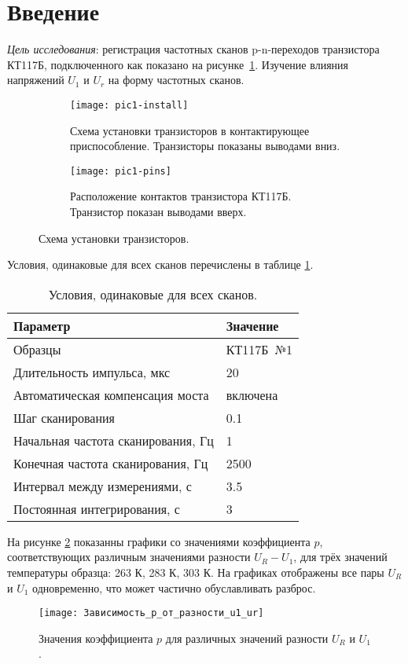 \section{Введение}

\emph{Цель исследования}: регистрация частотных сканов p-n-переходов 
транзистора КТ117Б, подключенного как показано на рисунке~\ref{pic:installation}. 
Изучение влияния напряжений $U_1$ и $U_r$ на форму частотных сканов.
\begin{figure}[!ht]
	\centering
	\begin{subfigure}[t]{0.45\textwidth}
		\centering
		\texttt{[image: pic1-install]}
		\caption{Схема установки транзисторов в контактирующее
		приспособление. Транзисторы показаны выводами вниз.}
	\end{subfigure}
	\begin{subfigure}[t]{0.45\textwidth}
		\centering
		\texttt{[image: pic1-pins]}
		\caption{Расположение контактов транзистора КТ117Б. Транзистор
		показан выводами вверх.}
	\end{subfigure}

	\caption{Схема установки транзисторов.}
	\label{pic:installation}
\end{figure}

Условия, одинаковые для всех сканов перечислены в таблице 
\ref{table:common_conditions}.
\begin{table}[!ht]
	\centering
	\caption{Условия, одинаковые для всех сканов.}
	\begin{tabular}{|l|l|}
		\hline
		Параметр                           & Значение             \\ \hline
		Образцы                            & КТ117Б~№1            \\ \hline
		Длительность импульса, мкс         & 20                   \\ \hline
		Автоматическая компенсация моста   & включена             \\ \hline
		Шаг сканирования                   & 0.1                  \\ \hline
		Начальная частота сканирования, Гц & 1                    \\ \hline
		Конечная  частота сканирования, Гц & 2500                 \\ \hline
		Интервал между измерениями, с      & 3.5                  \\ \hline
		Постоянная интегрирования, с       & 3                    \\ \hline
	\end{tabular}
	\label{table:common_conditions}
\end{table}

На рисунке \ref{pic:p_coef_plot} показанны графики со значениями 
коэффициента $p$, соответствующих различным значениями разности $U_R - U_1$,
для трёх значений температуры образца: 263 К, 283 К, 303 К. На графиках 
отображены все пары $U_R$ и $U_1$ одновременно, что может частично 
обуславливать разброс.
\begin{figure}[!ht]
	\centering
	\texttt{[image: Зависимость\_p\_от\_разности\_u1\_ur]}
	\caption{Значения коэффициента $p$ для различных значений разности $U_R$ и $U_1$.}
	\label{pic:p_coef_plot}
\end{figure}